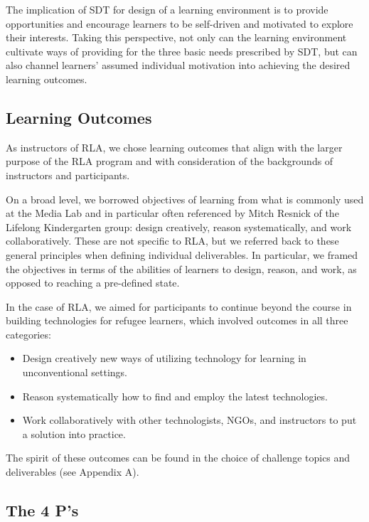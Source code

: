 \documentclass[12pt,twoside]{mitthesis}
\begin{document}
The implication of SDT for design of a learning environment is to provide opportunities and encourage learners to be self-driven and motivated to explore their interests. Taking this perspective, not only can the learning environment cultivate ways of providing for the three basic needs prescribed by SDT, but can also channel learners' assumed individual motivation into achieving the desired learning outcomes.~\cite{selfdetermination}\cite{niemiec2009autonomy}

\subsection{Learning Outcomes}

As instructors of RLA, we chose learning outcomes that align with the larger purpose of the RLA program and with consideration of the backgrounds of instructors and participants. 

On a broad level, we borrowed objectives of learning from what is commonly used at the Media Lab and in particular often referenced by Mitch Resnick of the Lifelong Kindergarten group: design creatively, reason systematically, and work collaboratively. These are not specific to RLA, but we referred back to these general principles when defining individual deliverables. In particular, we framed the objectives in terms of the abilities of learners to design, reason, and work, as opposed to reaching a pre-defined state.~\cite{roleofmaking}

In the case of RLA, we aimed for participants to continue beyond the course in building technologies for refugee learners, which involved outcomes in all three categories:
\begin{itemize}
\item Design creatively new ways of utilizing technology for learning in unconventional settings.
\item Reason systematically how to find and employ the latest technologies.
\item Work collaboratively with other technologists, NGOs, and instructors to put a solution into practice.
\end{itemize}
The spirit of these outcomes can be found in the choice of challenge topics and deliverables (see Appendix A).

\subsection{The 4 P's}
\end{document}

